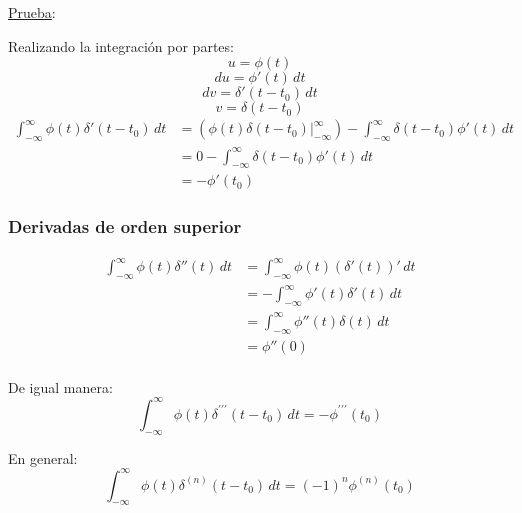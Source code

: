 \underline{Prueba}:

Realizando la integración por partes:
\begin{equation*}
    u=\phi(t)
\end{equation*}
\begin{equation*}
    du=\phi'(t)\,dt
\end{equation*}
\begin{equation*}
    dv=\delta'(t-t_0)\,dt
\end{equation*}
\begin{equation*}
    v=\delta(t-t_0)
\end{equation*}
\begin{equation*}
\begin{split}
    \int_{-\infty}^{\infty}\phi(t)\delta'(t-t_0)\,dt
        &=(\phi(t)\delta(t-t_0)\Big|_{-\infty}^{\infty})
        -\int_{-\infty}^{\infty}\delta(t-t_0)\phi'(t)\,dt\\
        &=0-\int_{-\infty}^{\infty}\delta(t-t_0)\phi'(t)\,dt\\
        &=-\phi'(t_0)
\end{split}
\end{equation*}

\subsubsection{Derivadas de orden superior}
\begin{equation*}
\begin{split}
    \int_{-\infty}^{\infty}\phi(t)\delta''(t)\,dt
        &=\int_{-\infty}^{\infty}\phi(t)(\delta'(t))'\,dt\\
        &=-\int_{-\infty}^{\infty}\phi'(t)\delta'(t)\,dt\\
        &=\int_{-\infty}^{\infty}\phi''(t)\delta(t)\,dt\\
        &=\phi''(0)\\
\end{split}
\end{equation*}

De igual manera:
\begin{equation*}
    \int_{-\infty}^{\infty}\phi(t)\delta^{\prime\prime\prime}(t-t_0)\,dt
        =-\phi^{\prime\prime\prime}(t_0)
\end{equation*}

En general:
\begin{equation}
    \int_{-\infty}^{\infty}\phi(t)\delta^{(n)}(t-t_0)\,dt
        ={(-1)}^n\phi^{(n)}(t_0)
\end{equation}

